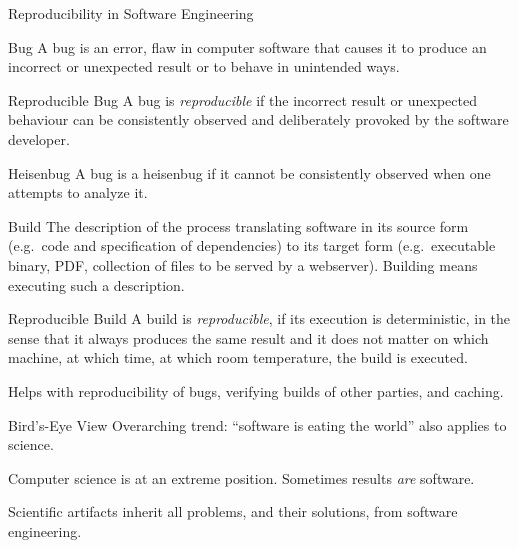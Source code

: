 \documentclass[xcolor={table,usenames,dvipsnames},aspectratio=169]{beamer}
\begin{document}
\begin{frame}[allowframebreaks]{Reproducibility in Software Engineering}

\begin{block}{Bug}
A bug is an error, flaw in computer software that causes it to produce
an incorrect or unexpected result or to behave in unintended ways.
\end{block}

\begin{block}{Reproducible Bug}
A bug is \emph{reproducible} if the incorrect result or unexpected behaviour
can be consistently observed and deliberately provoked
by the software developer.
\end{block}


\begin{block}{Heisenbug}
A bug is a heisenbug if it cannot be consistently observed
when one attempts to analyze it.
\end{block}

\framebreak

\begin{block}{Build}
The description of the process translating software in its source
form (e.g.\ code and specification of dependencies) to its target form
(e.g.\ executable binary, PDF, collection of files to be served by a webserver).
Building means executing such a description.
\end{block}

\begin{block}{Reproducible Build}
A build is \emph{reproducible}, if its execution is deterministic,
in the sense that it always produces the same result and
it does not matter on which machine, at which time,
at which room temperature, the build is executed.
\end{block}

Helps with reproducibility of bugs, verifying builds of other parties, and caching.
\end{frame}

\begin{frame}{Bird's-Eye View}
Overarching trend: \enquote{software is eating the world} also applies to science.

Computer science is at an extreme position.
Sometimes results \emph{are} software.

Scientific artifacts inherit all problems, and their solutions, from software engineering.
\end{frame}
\end{document}
